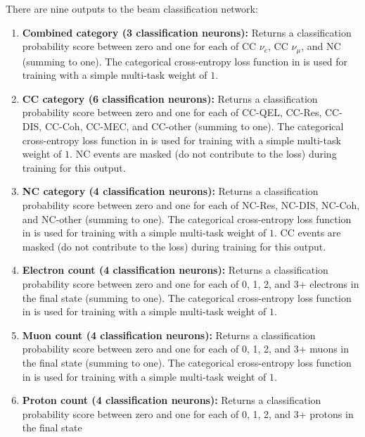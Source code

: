 There are nine outputs to the beam classification network:
\begin{enumerate}
    \item \textbf{Combined category (3 classification neurons):} Returns a classification
          probability score between zero and one for each of CC $\nu_{e}$, CC $\nu_{\mu}$, and NC
          (summing to one). The categorical cross-entropy loss function in
           is used for training with a simple multi-task
          weight of $1$.
    \item \textbf{CC category (6 classification neurons):} Returns a classification probability
          score between zero and one for each of CC-QEL, CC-Res, CC-DIS, CC-Coh, CC-MEC, and
          CC-other (summing to one). The categorical cross-entropy loss function in
           is used for training with a simple multi-task
          weight of $1$. NC events are masked (do not contribute to the loss) during training for
          this output.
    \item \textbf{NC category (4 classification neurons):} Returns a classification probability
          score between zero and one for each of NC-Res, NC-DIS, NC-Coh, and NC-other (summing to
          one). The categorical cross-entropy loss function in
           is used for training with a simple multi-task
          weight of $1$. CC events are masked (do not contribute to the loss) during training for
          this output.
    \item \textbf{Electron count (4 classification neurons):} Returns a classification probability
          score between zero and one for each of 0, 1, 2, and 3+ electrons in the final state
          (summing to one). The categorical cross-entropy loss function in
           is used for training with a simple multi-task
          weight of $1$.
    \item \textbf{Muon count (4 classification neurons):} Returns a classification probability
          score between zero and one for each of 0, 1, 2, and 3+ muons in the final state (summing
          to one). The categorical cross-entropy loss function in
           is used for training with a simple multi-task
          weight of $1$.
    \item \textbf{Proton count (4 classification neurons):} Returns a classification probability
          score between zero and one for each of 0, 1, 2, and 3+ protons in the final state

\end{enumerate}
